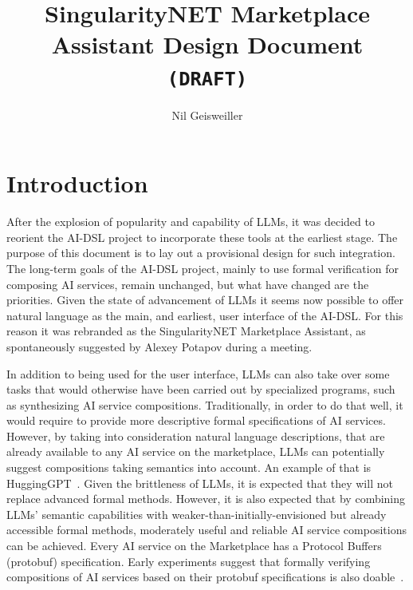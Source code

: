 \documentclass[]{article}
\begin{document}
\title{SingularityNET Marketplace Assistant Design Document\\
  \texttt{(DRAFT)}} \author{Nil Geisweiller}
\maketitle

\section{Introduction}
After the explosion of popularity and capability of LLMs, it was
decided to reorient the AI-DSL project to incorporate these tools at
the earliest stage.  The purpose of this document is to lay out a
provisional design for such integration.  The long-term goals of the
AI-DSL project, mainly to use formal verification for composing AI
services, remain unchanged, but what have changed are the priorities.
Given the state of advancement of LLMs it seems now possible to offer
natural language as the main, and earliest, user interface of the
AI-DSL.  For this reason it was rebranded as the SingularityNET
Marketplace Assistant, as spontaneously suggested by Alexey Potapov
during a meeting.

In addition to being used for the user interface, LLMs can also take
over some tasks that would otherwise have been carried out by
specialized programs, such as synthesizing AI service compositions.
Traditionally, in order to do that well, it would require to provide
more descriptive formal specifications of AI services.  However, by
taking into consideration natural language descriptions, that are
already available to any AI service on the marketplace, LLMs can
potentially suggest compositions taking semantics into account.  An
example of that is HuggingGPT~\cite{Shen2023}.  Given the brittleness
of LLMs, it is expected that they will not replace advanced formal
methods.  However, it is also expected that by combining LLMs'
semantic capabilities with weaker-than-initially-envisioned but
already accessible formal methods, moderately useful and reliable AI
service compositions can be achieved.  Every AI service on the
Marketplace has a Protocol Buffers (protobuf) specification.  Early
experiments suggest that formally verifying compositions of AI
services based on their protobuf specifications is also
doable~\cite{ProtobufCheckingXP2023}.
\end{document}
